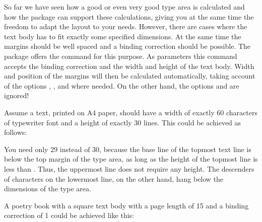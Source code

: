 %
\begin{Declaration}
\end{Declaration}%
So far we have seen how a good or even very good
type area is calculated and how the
 package can support these calculations, giving you
at the same time the freedom to adapt the layout to your needs.
However, there are cases where the text body has to fit exactly some
specified dimensions. At the same time the margins should be well
spaced and a binding correction should be possible. The
 package offers the command  for this
purpose. As parameters this command accepts the binding correction and
the width and height of the text body.  Width and position of the
margins will then be calculated automatically, taking account of the
options , ,
 and  where
needed.  On the other hand, the options
 and
 are ignored!

\begin{Example}
  Assume a text, printed on A4 paper, should have a width of exactly 60
  characters of typewriter font and a height of exactly 30 lines. This could
  be achieved as follows:
You need only 29 instead of 30, because the base line of the topmost
text line is  below the top margin of the type area, as
long as the height of the topmost line is less than
. Thus, the uppermost line does not require any
height. The descenders of characters on the lowermost line, on the
other hand, hang below the dimensions of the type area.

\item A poetry book with a square text body with a page length of
  15 and a binding correction of 1 could be
  achieved like this:
\end{Example}


